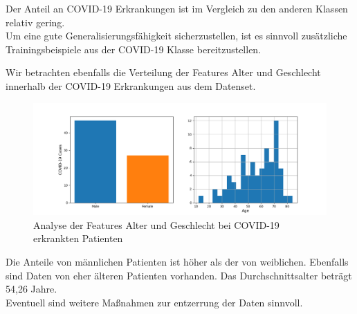 Der Anteil an COVID-19 Erkrankungen ist im Vergleich zu den anderen Klassen relativ gering.\\
Um eine gute Generalisierungsfähigkeit sicherzustellen, ist es sinnvoll zusätzliche Trainingsbeispiele aus der COVID-19 Klasse bereitzustellen.

Wir betrachten ebenfalls die Verteilung der Features Alter und Geschlecht innerhalb der COVID-19 Erkrankungen aus dem Datenset.

\begin{figure}[ht]
	\centering
	\includegraphics[width=\textwidth]{../features_analysis.png}
	\caption{Analyse der Features Alter und Geschlecht bei COVID-19 erkrankten Patienten}
\end{figure}

Die Anteile von männlichen Patienten ist höher als der von weiblichen. Ebenfalls sind Daten von eher älteren Patienten vorhanden. Das Durchschnittsalter beträgt 54,26 Jahre.\\
Eventuell sind weitere Maßnahmen zur entzerrung der Daten sinnvoll.
